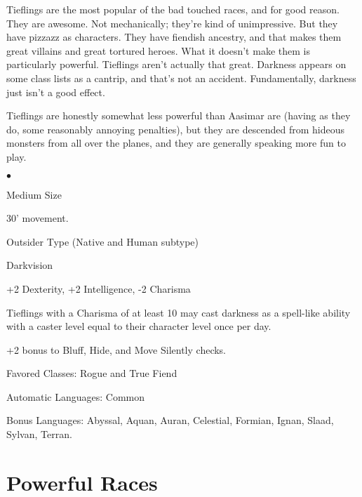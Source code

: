 Tieflings are the most popular of the bad touched races, and for good reason. They are awesome. Not mechanically; they're kind of unimpressive. But they have pizzazz as characters. They have fiendish ancestry, and that makes them great villains and great tortured heroes. What it doesn't make them is particularly powerful. Tieflings aren't actually that great. Darkness appears on some class lists as a cantrip, and that's not an accident. Fundamentally, darkness just isn't a good effect.

Tieflings are honestly somewhat less powerful than Aasimar are (having as they do, some reasonably annoying penalties), but they are descended from hideous monsters from all over the planes, and they are generally speaking more fun to play.

\begin{list}{$\bullet$}{\itemspace}
    \item Medium Size
    \item 30' movement.
    \item Outsider Type (Native and Human subtype)
    \item Darkvision
    \item +2 Dexterity, +2 Intelligence, -2 Charisma
    \item Tieflings with a Charisma of at least 10 may cast darkness as a spell-like ability with a caster level equal to their character level once per day.
    \item +2 bonus to Bluff, Hide, and Move Silently checks.
    \item Favored Classes: Rogue and True Fiend
    \item Automatic Languages: Common
    \item Bonus Languages: Abyssal, Aquan, Auran, Celestial, Formian, Ignan, Slaad, Sylvan, Terran.
\end{list}

\section{Powerful Races}

